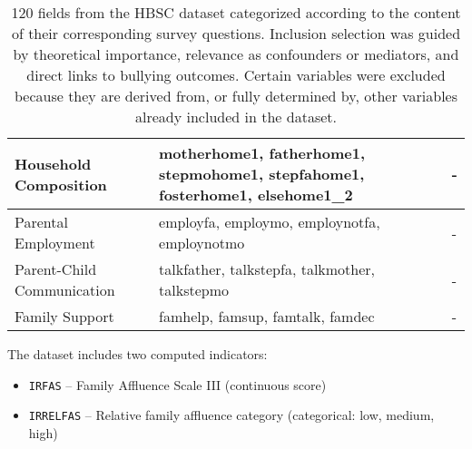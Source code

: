 \documentclass[main.tex]{subfiles}
\begin{document}
\begin{table}[h]
\begin{tabular}{|p{25mm}|p{65mm}|p{65mm}|}
        Household Composition & motherhome1, fatherhome1, stepmohome1, stepfahome1, fosterhome1, elsehome1\_2 & - \\ \hline
        Parental Employment & employfa, employmo, employnotfa, employnotmo & - \\ \hline
        Parent-Child Communication & talkfather, talkstepfa, talkmother, talkstepmo & - \\ \hline
        Family Support & famhelp, famsup, famtalk, famdec & - \\ \hline
    \end{tabular}
  \caption{120 fields from the HBSC dataset categorized according to the content of their corresponding survey questions. Inclusion selection was guided by theoretical importance, relevance as confounders or mediators, and direct links to bullying outcomes. Certain variables were excluded because they are derived from, or fully determined by, other variables already included in the dataset.}
  \label{tab:hbsc_variables_grouped}
\end{table}
The dataset includes two computed indicators:
\begin{itemize}
 \item \texttt{IRFAS} – Family Affluence Scale III (continuous score)
 \item \texttt{IRRELFAS} – Relative family affluence category (categorical: low, medium, high)
\end{itemize}
 
\end{document}
